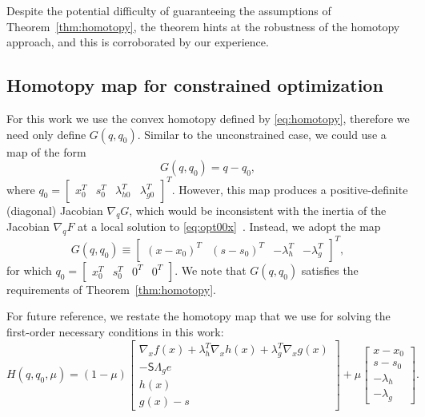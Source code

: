 Despite the potential difficulty of guaranteeing the assumptions of
Theorem~\ref{thm:homotopy}, the theorem hints at the robustness of the homotopy
approach, and this is corroborated by our experience.

\subsection{Homotopy map for constrained optimization}\label{sec:map}

For this work we use the convex homotopy defined by \eqref{eq:homotopy},
therefore we need only define $G(q,q_0)$.  Similar to the unconstrained case, we
could use a map of the form
\begin{equation*}
  G(q,q_0) = q - q_0,
\end{equation*}
where $q_0 = \begin{bmatrix} x_0^T & s_0^T & \lambda_{h0}^T &  \lambda_{g0}^T \end{bmatrix}^T$.  However, this map produces a
positive-definite (diagonal) Jacobian $\nabla_q G$, which would be inconsistent
with the inertia of the Jacobian $\nabla_q F$ at a local solution to
\eqref{eq:opt00x}~\cite{Nocedal2006NO}.  Instead, we adopt the map
\begin{equation*}
  G(q,q_0) \equiv \begin{bmatrix}
    (x - x_0)^T &
    (s - s_0)^T &
    -\lambda_h^T & 
    -\lambda_g^T
  \end{bmatrix}^T, 
\end{equation*}
for which $q_0 = \begin{bmatrix} x_0^T & s_0^T & 0^T & 0^T \end{bmatrix}$.
We note that $G(q,q_0)$ satisfies the requirements of
Theorem~\ref{thm:homotopy}. 

For future reference, we restate the homotopy map that we use for solving the
first-order necessary conditions in this work:
\begin{equation}\label{eq:homo0}
    H(q, q_0, \mu) = (1-\mu)
    \begin{bmatrix}
      \nabla_x f(x) +   \lambda_h^T \nabla_x h(x)  +   \lambda_g^T \nabla_x g(x) \\
      -\mathsf{S}\mathsf{\Lambda}_g e \\
      h(x) \\
      g(x) - s 
    \end{bmatrix}
    + \mu
    \begin{bmatrix}
      x - x_0 \\
      s - s_0 \\
      -\lambda_h \\
      -\lambda_g
    \end{bmatrix}.
\end{equation}

